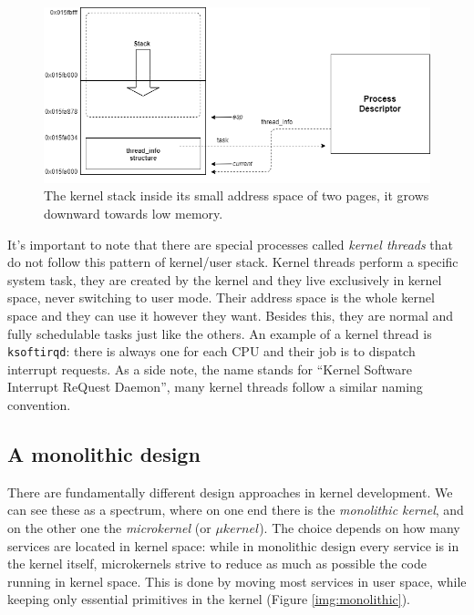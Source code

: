 \begin{figure}[ht]
\includegraphics[width=\textwidth]{images/stack}
\caption{The kernel stack inside its small address space of two pages, it grows downward towards low memory.}
\label{img:stack}
\end{figure}

It's important to note that there are special processes called \textit{kernel threads} that do not follow this pattern of kernel/user stack. Kernel threads perform a specific system task, they are created by the kernel and they live exclusively in kernel space, never switching to user mode. Their address space is the whole kernel space and they can use it however they want. Besides this, they are normal and fully schedulable tasks just like the others. An example of a kernel thread is \verb|ksoftirqd|: there is always one for each CPU and their job is to dispatch interrupt requests. As a side note, the name stands for ``Kernel Software Interrupt ReQuest Daemon'', many kernel threads follow a similar naming convention. 

\subsection{A monolithic design}
\label{sec:monolithic}
There are fundamentally different design approaches in kernel development. We can see these as a spectrum, where on one end there is the \textit{monolithic kernel}, and on the other one the \textit{microkernel} (or $\mu kernel$). The choice depends on how many services are located in kernel space: while in monolithic design every service is in the kernel itself, microkernels strive to reduce as much as possible the code running in kernel space. This is done by moving most services in user space, while keeping only essential primitives in the kernel (Figure \ref{img:monolithic}).

